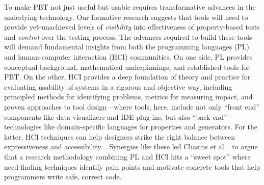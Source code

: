 To make PBT not just useful but
{usable} requires transformative advances in the underlying technology.
Our formative research suggests that tools will need to provide
yet-unachieved levels of
\emph{visibility} into effectiveness of property-based tests and \emph{control}
over the testing process.
%
The advances required to build these tools
will demand fundamental insights from both the
programming languages (PL) and human-computer interaction (HCI)
communities.
On one side, PL provides conceptual background,
mathematical underpinnings, and established tools for PBT.  On the
other, HCI provides a deep foundation of theory and
practice for evaluating usability of systems in a
rigorous and objective way, including principled methods for
identifying problems, metrics for measuring impact, and proven
approaches to tool design---where tools, here, include
not only ``front end'' components like
data visualizers and IDE plug-ins, but
also ``back end'' technologies like domain-specific languages for
properties and generators.  For the latter, HCI techniques
can help designers
strike the right balance between expressiveness and
accessibility~\cite{coblenz_pliers_2021,greenman_little_2022}.
Synergies like these led
Chasins et al.~\cite{chasins_pl_2021} to argue that a research
methodology combining PL and HCI hits a ``sweet spot'' where
need-finding techniques identify
pain points and motivate concrete tools that help programmers write
safe, correct code.

